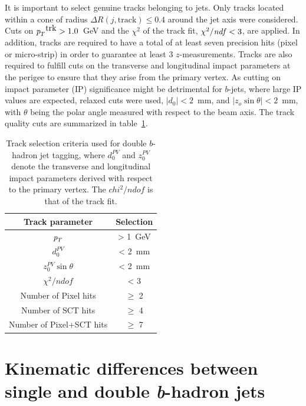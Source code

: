  It is important to select genuine tracks belonging to jets. Only tracks located  within a cone of radius $\Delta R(j,\mbox{track}) \leq 0.4$ around the jet axis were considered. %
  Cuts on ${\emph{p}_{T}}^{\mbox{trk}}>1.0$~GeV and the $\chi^2$ of the track fit, $\chi^2/{\it ndf}<3$, are applied. %
 In addition, tracks are required to have a total of at least seven precision hits (pixel or micro-strip) in order to guarantee at least 3 $z$-measurements. Tracks are also required to fulfill cuts on the transverse and longitudinal impact parameters at the perigee to ensure that they arise from  the primary vertex. As cutting on impact parameter (IP) significance might be detrimental for $b$-jets, where large IP values are expected, relaxed cuts were used, $|d_{0}|<2$~mm, and $|z_{o}\sin\theta|<2$~mm, with $\theta$ being the polar angle measured with respect to the beam axis. The track quality cuts are summarized in table~\ref{tb:tracks}. %


\begin{table}[!hbt] %
\renewcommand{\arraystretch}{1.2}
\centering
\begin{tabular}{ c  c  }
  \hline
  Track parameter &  Selection \\ \hline
  ${\emph{p}_{T}}$   &   > 1~GeV \\
  $d_0^{PV}$   &   < 2~mm \\
  $z_0^{PV}\sin \theta$   &   < 2~mm \\
  $\chi^2 /ndof$   &   < 3 \\
  Number of Pixel hits   &  $\geq$ 2 \\
  Number of SCT hits   &   $\geq$ 4 \\
  Number of Pixel+SCT hits   &  $\geq$ 7 \\ \hline
\end{tabular}
\caption{Track selection criteria used for double $b$-hadron jet tagging, where $d_0^{PV}$ and $z_0^{PV}$ denote the transverse and longitudinal impact parameters derived with respect to the primary vertex. The $chi^2 / ndof$ is that of the track fit.}
\label{tb:tracks}
\end{table}




\section{Kinematic differences between single and double \emph{\textbf{b}}-hadron jets}\label{sec:gbbKine}


